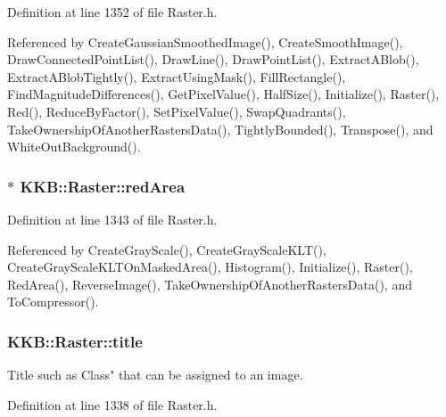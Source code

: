 Definition at line 1352 of file Raster.\+h.



Referenced by Create\+Gaussian\+Smoothed\+Image(), Create\+Smooth\+Image(), Draw\+Connected\+Point\+List(), Draw\+Line(), Draw\+Point\+List(), Extract\+A\+Blob(), Extract\+A\+Blob\+Tightly(), Extract\+Using\+Mask(), Fill\+Rectangle(), Find\+Magnitude\+Differences(), Get\+Pixel\+Value(), Half\+Size(), Initialize(), Raster(), Red(), Reduce\+By\+Factor(), Set\+Pixel\+Value(), Swap\+Quadrants(), Take\+Ownership\+Of\+Another\+Rasters\+Data(), Tightly\+Bounded(), Transpose(), and White\+Out\+Background().

\subsubsection[{\texorpdfstring{red\+Area}{redArea}}]{$\ast$ K\+K\+B\+::\+Raster\+::red\+Area\hspace{0.3cm}{\ttfamily [protected]}}\hypertarget{class_k_k_b_1_1_raster_aaef16f7d4dc7c8b99e84176d0babd731}{}\label{class_k_k_b_1_1_raster_aaef16f7d4dc7c8b99e84176d0babd731}


Definition at line 1343 of file Raster.\+h.



Referenced by Create\+Gray\+Scale(), Create\+Gray\+Scale\+K\+L\+T(), Create\+Gray\+Scale\+K\+L\+T\+On\+Masked\+Area(), Histogram(), Initialize(), Raster(), Red\+Area(), Reverse\+Image(), Take\+Ownership\+Of\+Another\+Rasters\+Data(), and To\+Compressor().

\subsubsection[{\texorpdfstring{title}{title}}]{ K\+K\+B\+::\+Raster\+::title\hspace{0.3cm}{\ttfamily [protected]}}\hypertarget{class_k_k_b_1_1_raster_a2dc74728363b538563b6626422651236}{}\label{class_k_k_b_1_1_raster_a2dc74728363b538563b6626422651236}
Title such as \textquotesingle{}Class" that can be assigned to an image. 

Definition at line 1338 of file Raster.\+h.



